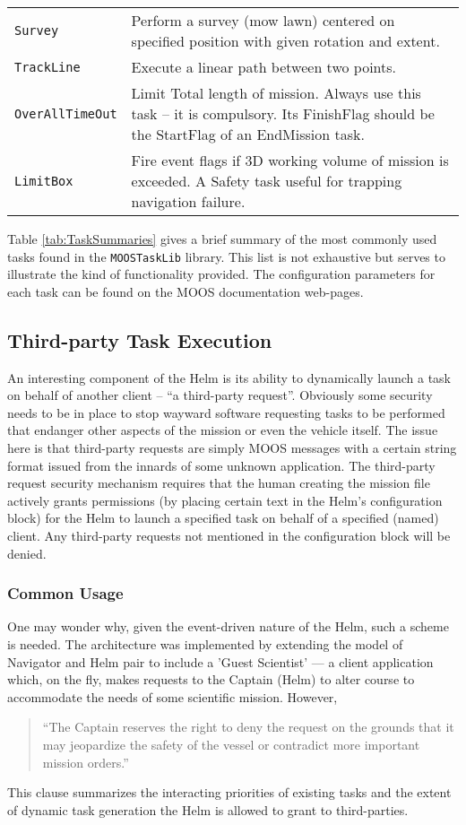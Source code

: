 \documentclass[a4paper,10pt]{article}
\newcommand{\Code}[1]{\texttt{#1} }
\newcommand{\code}[1]{\Code{#1} }
\begin{document}
\begin{table}[ht]
\begin{tabular}{p{}|p{}}
%
\code{Survey} & Perform a survey (mow lawn) centered  on specified
position with given rotation and extent.\\%
%
\code{TrackLine} & Execute a linear path between two points.
\\%
%
\code{OverAllTimeOut} & Limit Total length of mission. Always use
this task -- it is compulsory. Its FinishFlag should be the
StartFlag of an EndMission task.
\\%
%
\code{LimitBox} & Fire event flags if 3D working volume of mission
is exceeded. A Safety task useful for trapping navigation failure.
\\%
\end{tabular}
\end{table}


Table \ref{tab:TaskSummaries} gives a brief summary of the most
commonly used tasks found in the \code{MOOSTaskLib} library. This
list is not exhaustive but serves to illustrate the kind of
functionality provided. The configuration parameters for each task
can be found on the MOOS documentation web-pages.


\subsection{Third-party Task Execution}
An interesting component of the Helm is its ability to dynamically
launch a task on behalf of another client -- ``a third-party
request''. Obviously some security needs to be in place to stop
wayward software requesting tasks to be performed that endanger
other aspects of the mission or even the vehicle itself. The issue
here is that third-party requests are simply MOOS messages with a
certain string format issued from the innards of some unknown
application. The third-party request security mechanism requires
that the human creating the mission file actively grants
permissions (by placing certain text in the Helm's configuration
block) for the Helm to launch a specified task on behalf of a
specified (named) client. Any third-party requests not mentioned
in the configuration block will be denied.

\subsubsection{Common Usage}
One may wonder why, given the event-driven nature of the Helm, such
a scheme is needed. The architecture was implemented by extending
the model of Navigator and Helm pair to include a 'Guest
Scientist' --- a client application which, on the fly, makes
requests to the Captain (Helm) to alter course to accommodate the
needs of some scientific mission. However,\begin{quote}``The
Captain reserves the right to deny the request on the grounds that
it may jeopardize the safety of the vessel or contradict more
important mission orders.''\end{quote} This clause summarizes the
interacting priorities of existing tasks and the extent of dynamic
task generation the Helm is allowed to grant to third-parties.
\end{document}
